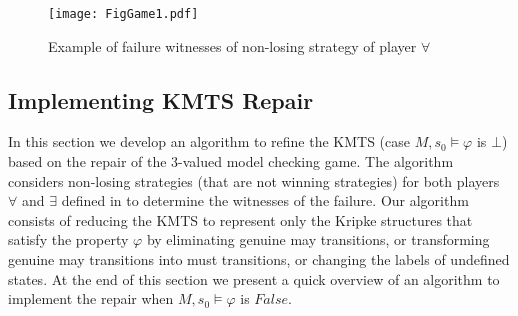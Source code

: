 \documentclass{llncs}
\begin{document}
\begin{figure}[h]
\centering
\texttt{[image: FigGame1.pdf]}
\vspace*{-0.5cm}
\caption{Example of failure witnesses of non-losing strategy of player $\forall$}
\label{figGame1}
\end{figure}
\vspace{-.5cm}

\subsection{Implementing KMTS Repair}

In this section we develop an algorithm to refine the KMTS (case $M,s_{0} \models \varphi$ is $\bot$) based on the repair of the 3-valued model checking game. The algorithm considers non-losing strategies (that are not winning strategies) for both players $\forall$ and $\exists$ defined in \cite{GLLS07} to determine the witnesses of the failure. Our algorithm consists of reducing the KMTS to represent only the Kripke structures that satisfy the property $\varphi$ by eliminating genuine may transitions, or transforming genuine may transitions into must transitions, or changing the labels of undefined states. At the end of this section we present a quick overview of an algorithm to implement the repair when $M,s_{0} \models \varphi$ is $False$. 
\end{document}
